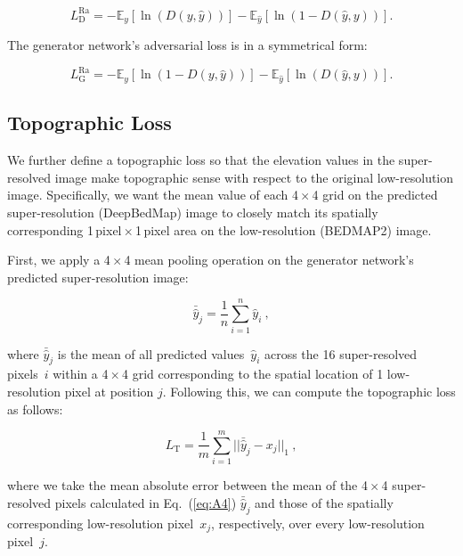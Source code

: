 \begin{appendices}
\begin{equation}\label{eq:A2}
  L_{\mathrm{D}}^{\text{Ra}} = - \mathbb{E}_y[\ln(D(y,\hat{y}))] - \mathbb{E}_{\hat{y}}[\ln(1 - D(\hat{y},y))].
\end{equation}

The generator network's adversarial loss is in a symmetrical form:

\begin{equation}\label{eq:A3}
  L_{\mathrm{G}}^{\text{Ra}} = - \mathbb{E}_y[\ln(1 - D(y,\hat{y}))] - \mathbb{E}_{\hat{y}}[\ln(D(\hat{y},y))].
\end{equation}

\subsection{Topographic Loss}

We further define a topographic loss so that the elevation values in the super-resolved image make topographic sense with respect to the original low-resolution image.
Specifically, we want the mean value of each 4\,$\times$\,4 grid on the predicted super-resolution (DeepBedMap) image to closely match its spatially corresponding 1\,\unit{pixel}\,$\times$\,1\,\unit{pixel} area on the low-resolution (BEDMAP2) image.

First, we apply a 4\,$\times$\,4 mean pooling operation on the generator network's predicted super-resolution image:

\begin{equation}\label{eq:A4}
  \bar{\hat{y}}_j = \dfrac{1}{n} \sum\limits_{i=1}^n \hat{y}_i~,
\end{equation}

where $\bar{\hat{y}}_j$ is the mean of all predicted values~$\hat{y}_i$ across the 16 super-resolved pixels~$i$ within a 4\,$\times$\,4 grid corresponding to the spatial location of 1 low-resolution pixel at position $j$.
Following this, we can compute the topographic loss as follows:

\begin{equation}\label{eq:A5}
  L_{\mathrm{T}} = \dfrac{1}{m} \sum\limits_{i=1}^m ||\bar{\hat{y}}_j - x_j||_{1}~,
\end{equation}

where we take the mean absolute error between the mean of the 4\,$\times$\,4 super-resolved pixels calculated in Eq.~(\ref{eq:A4}) $\bar{\hat{y}}_j$ and those of the spatially corresponding low-resolution pixel~$x_j$, respectively, over every low-resolution pixel~$j$.


\end{appendices}
